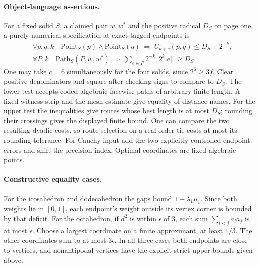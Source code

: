 \paragraph{Object-language assertions.}
For a fixed solid $S$, a claimed pair $w,w^*$ and the positive radical $D_S$ on page one, a purely numerical specification at exact tagged endpoints is
\begin{align*}
 &\forall p,q,k\quad \mathrm{Point}_S(p)\land\mathrm{Point}_S(q)
     \ \Longrightarrow\ U_{k+c}(p,q)\le D_S+2^{-k},\\
 &\forall P,k\quad \mathrm{Path}_S(P,w,w^*)
     \ \Longrightarrow\ \sum_{e\in P}2^{-k}\lceil 2^k|e|\rceil\ge D_S .
\end{align*}
One may take $c=6$ simultaneously for the four solids, since $2^6\ge3f$. Clear positive denominators and square after checking signs to compare to $D_S$. The lower test accepts coded algebraic facewise paths of arbitrary finite length. A fixed witness strip and the mesh estimate give equality of distance names. For the upper test the inequalities give routes whose best length is at most $D_S$; rounding their crossings gives the displayed finite bound. One can compare the two resulting dyadic costs, so route selection on a real-order tie costs at most its rounding tolerance. For Cauchy input add the two explicitly controlled endpoint errors and shift the precision index. Optimal coordinates are fixed algebraic points.

\paragraph{Constructive equality cases.}
For the icosahedron and dodecahedron the gaps bound $1-\lambda_1\mu_1$. Since both weights lie in $[0,1]$, each endpoint's weight outside its vertex corner is bounded by that deficit. For the octahedron, if $d^2$ is within $\epsilon$ of $3$, each sum $\sum_{i<j}a_i a_j$ is at most $\epsilon$. Choose a largest coordinate on a finite approximant, at least $1/3$. The other coordinates sum to at most $3\epsilon$. In all three cases both endpoints are close to vertices, and nonantipodal vertices have the explicit strict upper bounds given above.

